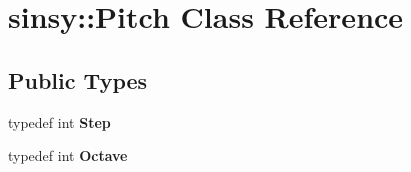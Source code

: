 \hypertarget{classsinsy_1_1Pitch}{\section{sinsy\-:\-:\-Pitch \-Class \-Reference}
\label{classsinsy_1_1Pitch}
}
\subsection*{\-Public \-Types}
\begin{DoxyCompactItemize}
\item 
\hypertarget{classsinsy_1_1Pitch_a1ba803ce1e882d329aa7fef5b4bad989}{typedef int {\bfseries \-Step}}\label{classsinsy_1_1Pitch_a1ba803ce1e882d329aa7fef5b4bad989}

\item 
\hypertarget{classsinsy_1_1Pitch_a6751cdb04ee2bcd161ceea0aae135e4f}{typedef int {\bfseries \-Octave}}\label{classsinsy_1_1Pitch_a6751cdb04ee2bcd161ceea0aae135e4f}

\end{DoxyCompactItemize}
